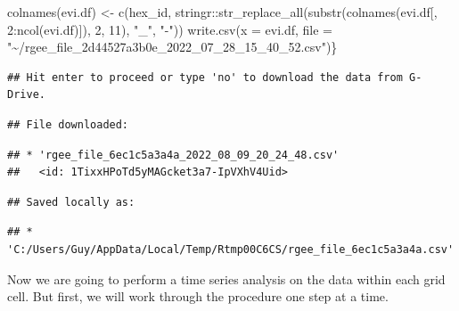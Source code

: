 \documentclass[10pt]{report}
\newenvironment{Shaded}{\begin{snugshade}}{\end{snugshade}}
\newcommand{\AttributeTok}[1]{\textcolor[rgb]{0.77,0.63,0.00}{#1}}
\newcommand{\DecValTok}[1]{\textcolor[rgb]{0.00,0.00,0.81}{#1}}
\newcommand{\FunctionTok}[1]{\textcolor[rgb]{0.00,0.00,0.00}{#1}}
\newcommand{\NormalTok}[1]{#1}
\newcommand{\OtherTok}[1]{\textcolor[rgb]{0.56,0.35,0.01}{#1}}
\newcommand{\SpecialCharTok}[1]{\textcolor[rgb]{0.00,0.00,0.00}{#1}}
\newcommand{\StringTok}[1]{\textcolor[rgb]{0.31,0.60,0.02}{#1}}
\begin{document}
\begin{Shaded}
\begin{Highlighting}[]
\FunctionTok{colnames}\NormalTok{(evi.df) }\OtherTok{\textless{}{-}} \FunctionTok{c}\NormalTok{(}\StringTok{\textquotesingle{}hex\_id\textquotesingle{}}\NormalTok{, stringr}\SpecialCharTok{::}\FunctionTok{str\_replace\_all}\NormalTok{(}\FunctionTok{substr}\NormalTok{(}\FunctionTok{colnames}\NormalTok{(evi.df[, }\DecValTok{2}\SpecialCharTok{:}\FunctionTok{ncol}\NormalTok{(evi.df)]), }\DecValTok{2}\NormalTok{, }\DecValTok{11}\NormalTok{), }\StringTok{"\_"}\NormalTok{, }\StringTok{"{-}"}\NormalTok{))}
\FunctionTok{write.csv}\NormalTok{(}\AttributeTok{x =}\NormalTok{ evi.df, }\AttributeTok{file =} \StringTok{"\textasciitilde{}/rgee\_file\_2d44527a3b0e\_2022\_07\_28\_15\_40\_52.csv"}\NormalTok{)\}}
\end{Highlighting}
\end{Shaded}

\begin{verbatim}
## Hit enter to proceed or type 'no' to download the data from G-Drive.
\end{verbatim}

\begin{verbatim}
## File downloaded:
\end{verbatim}

\begin{verbatim}
## * 'rgee_file_6ec1c5a3a4a_2022_08_09_20_24_48.csv'
##   <id: 1TixxHPoTd5yMAGcket3a7-IpVXhV4Uid>
\end{verbatim}

\begin{verbatim}
## Saved locally as:
\end{verbatim}

\begin{verbatim}
## * 'C:/Users/Guy/AppData/Local/Temp/Rtmp00C6CS/rgee_file_6ec1c5a3a4a.csv'
\end{verbatim}

Now we are going to perform a time series analysis on the data within
each grid cell. But first, we will work through the procedure one step
at a time.
\end{document}
